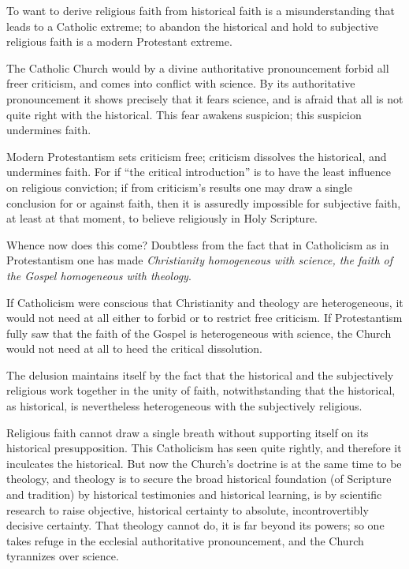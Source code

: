 \documentclass[12pt,a4paper]{book}
\begin{document}
To want to derive religious faith from historical faith is a misunderstanding
that leads to a Catholic extreme; to abandon the historical and hold to
subjective religious faith is a modern Protestant extreme.

The Catholic Church would by a divine authoritative pronouncement forbid all
freer criticism, and comes into conflict with science. By its authoritative
pronouncement it shows precisely that it fears science, and is afraid that all
is not quite right with the historical. This fear awakens suspicion; this
suspicion undermines faith.

Modern Protestantism sets criticism free; criticism dissolves the historical,
and undermines faith. For if ``the critical
introduction'' is to have the least influence on religious conviction; if from
criticism's results one may draw a single conclusion for or against faith, then
it is assuredly impossible for subjective faith, at least at that moment, to
believe religiously in Holy Scripture.

Whence now does this come? Doubtless from the fact that in Catholicism as in
Protestantism one has made \emph{Christianity homogeneous with science, the
faith of the Gospel homogeneous with theology}.

If Catholicism were conscious that Christianity and theology are heterogeneous,
it would not need at all either to forbid or to restrict free criticism. If
Protestantism fully saw that the faith of the Gospel is heterogeneous with
science, the Church would not need at all to heed the critical dissolution.

The delusion maintains itself by the fact that the historical and the
subjectively religious work together in the unity of faith, notwithstanding that
the historical, as historical, is nevertheless heterogeneous with the
subjectively religious.

Religious faith cannot draw a single breath without supporting itself on its
historical presupposition. This Catholicism has seen quite rightly, and
therefore it inculcates the historical. But now the Church's doctrine is at the
same time to be theology, and theology is to secure the broad historical
foundation (of Scripture and tradition) by historical testimonies and historical
learning, is by scientific research to raise objective, historical certainty to
absolute, incontrovertibly decisive certainty. That theology cannot do, it is
far beyond its powers; so one takes refuge in the ecclesial authoritative
pronouncement, and the Church tyrannizes over science.
\end{document}
